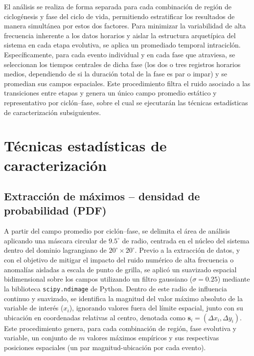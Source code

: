 El análisis se realiza de forma separada para cada combinación de región de ciclogénesis y fase del ciclo de vida, permitiendo estratificar los resultados de manera simultánea por estos dos factores. Para minimizar la variabilidad de alta frecuencia inherente a los datos horarios y aislar la estructura arquetípica del sistema en cada etapa evolutiva, se aplica un promediado temporal intraciclón. Específicamente, para cada evento individual y en cada fase que atraviesa, se seleccionan los tiempos centrales de dicha fase (los dos o tres registros horarios medios, dependiendo de si la duración total de la fase es par o impar) y se promedian sus campos espaciales. Este procedimiento filtra el ruido asociado a las transiciones entre etapas y genera un único campo promedio estático y representativo por ciclón--fase, sobre el cual se ejecutarán las técnicas estadísticas de caracterización subsiguientes.

\section{Técnicas estadísticas de caracterización}\label{sec:tecnicas_estadisticas}

\subsection{Extracción de máximos -- densidad de probabilidad (PDF)}\label{subsec:extraccion_pdf}

A partir del campo promedio por ciclón--fase, se delimita el área de análisis aplicando una máscara circular de $9.5^{\circ}$ de radio, centrada en el núcleo del sistema dentro del dominio lagrangiano de $20^{\circ} \times 20^{\circ}$. Previo a la extracción de datos, y con el objetivo de mitigar el impacto del ruido numérico de alta frecuencia o anomalías aisladas a escala de punto de grilla, se aplicó un suavizado espacial bidimensional sobre los campos utilizando un filtro gaussiano ($\sigma = 0.25$) mediante la biblioteca \texttt{scipy.ndimage} de Python. Dentro de este radio de influencia continuo y suavizado, se identifica la magnitud del valor máximo absoluto de la variable de interés ($x_i$), ignorando valores fuera del límite espacial, junto con su ubicación en coordenadas relativas al centro, denotada como $\mathbf{s}_i=(\Delta x_i,\Delta y_i)$. Este procedimiento genera, para cada combinación de región, fase evolutiva y variable, un conjunto de $m$ valores máximos empíricos y sus respectivas posiciones espaciales (un par magnitud-ubicación por cada evento).

